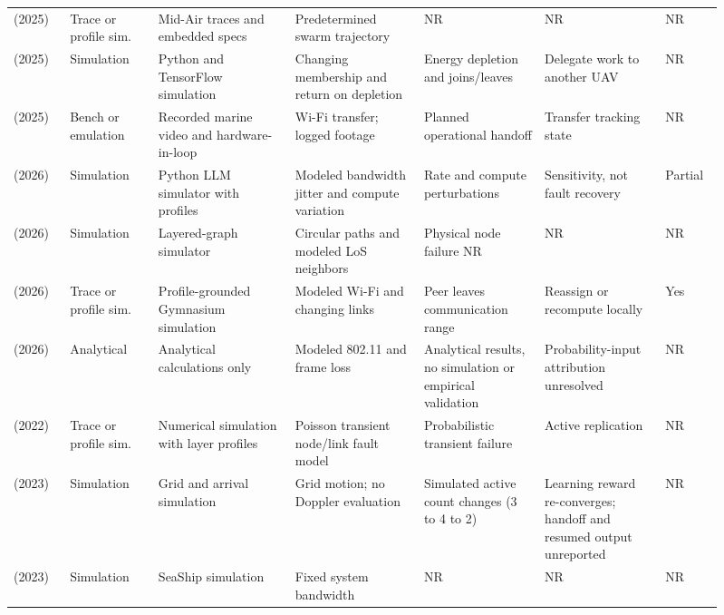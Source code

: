 \begin{longtable}{@{}Y{0.075\linewidth}Y{0.116\linewidth}Y{0.17\linewidth}Y{0.163\linewidth}Y{0.156\linewidth}Y{0.153\linewidth}Y{0.077\linewidth}@{}}
\cite{R0059}\newline\mbox{(2025)} & Trace or profile sim. & Mid-Air traces and embedded specs & Predetermined swarm trajectory & NR & NR & NR \\
\cite{R0068}\newline\mbox{(2025)} & Simulation & Python and TensorFlow simulation & Changing membership and return on depletion & Energy depletion and joins\allowbreak{}/leaves & Delegate work to another UAV & NR \\
\cite{R0292}\newline\mbox{(2025)} & Bench or emulation & Recorded marine video and hardware-in-loop & Wi-Fi transfer; logged footage & Planned operational handoff & Transfer tracking state & NR \\
\cite{R0074}\newline\mbox{(2026)} & Simulation & Python LLM simulator with profiles & Modeled bandwidth jitter and compute variation & Rate and compute perturbations & Sensitivity, not fault recovery & Partial \\
\cite{R0077}\newline\mbox{(2026)} & Simulation & Layered-graph simulator & Circular paths and modeled LoS neighbors & Physical node failure NR & NR & NR \\
\cite{R0092}\newline\mbox{(2026)} & Trace or profile sim. & Profile-grounded Gymnasium simulation & Modeled Wi-Fi and changing links & Peer leaves communication range & Reassign or recompute locally & Yes \\
\cite{R0121}\newline\mbox{(2026)} & Analytical & Analytical calculations only & Modeled 802.11 and frame loss & Analytical results, no simulation or empirical validation & Probability-input attribution unresolved & NR \\
\cite{R0029}\newline\mbox{(2022)} & Trace or profile sim. & Numerical simulation with layer profiles & Poisson transient node\allowbreak{}/link fault model & Probabilistic transient failure & Active replication & NR \\
\cite{R0019}\newline\mbox{(2023)} & Simulation & Grid and arrival simulation & Grid motion; no Doppler evaluation & Simulated active count changes (3 to 4 to 2) & Learning reward re-converges; handoff and resumed output unreported & NR \\
\cite{R0043}\newline\mbox{(2023)} & Simulation & SeaShip simulation & Fixed system bandwidth & NR & NR & NR \\

\end{longtable}
